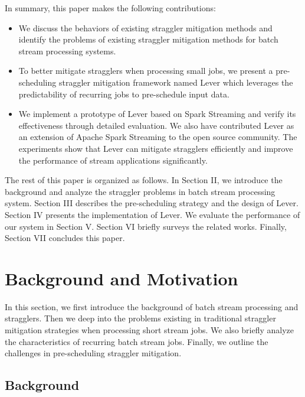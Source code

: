 \documentclass[10pt,conference,compsocconf,letterpaper]{IEEEtran}
\begin{document}
  In summary, this paper makes the following contributions:
\begin{itemize}
  \item We discuss the behaviors of existing straggler mitigation methods and identify the problems of existing straggler mitigation methods for batch stream processing systems.

  \item To better mitigate stragglers when processing small jobs, we present a pre-scheduling straggler mitigation framework named Lever which leverages the predictability of recurring jobs to pre-schedule input data.

  \item We implement a prototype of Lever based on Spark Streaming and verify its effectiveness through detailed evaluation. We also have contributed Lever as an extension of Apache Spark Streaming to the open source community. The experiments show that Lever can mitigate stragglers efficiently and improve the performance of stream applications significantly.
\end{itemize}

  The rest of this paper is organized as follows. In Section II, we introduce the background and analyze the straggler problems in batch stream processing system. Section III describes the pre-scheduling strategy and the design of Lever. Section IV presents the implementation of Lever. We evaluate the performance of our system in Section V. Section VI briefly surveys the related works. Finally, Section VII concludes this paper.

\section{Background and Motivation}

  In this section, we first introduce the background of batch stream processing and stragglers. Then we deep into the problems existing in traditional straggler mitigation strategies when processing short stream jobs. We also briefly analyze the characteristics of recurring batch stream jobs. Finally, we outline the challenges in pre-scheduling straggler mitigation.

\subsection{Background}
\end{document}
